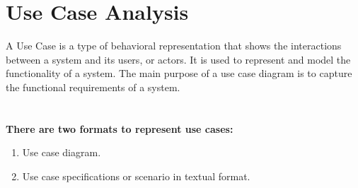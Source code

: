 \section{Use Case Analysis}
A Use Case is a type of behavioral representation that shows the interactions
between a system and its users, or actors. It is used to represent and model the
functionality of a system. The main purpose of a use case diagram is to capture
the functional requirements of a system. 
\\ \\ \\
\textbf{There are two formats to represent use cases:}
\begin{enumerate}
    \item Use case diagram.
    \item Use case specifications or scenario in textual format.
\end{enumerate}

\newpage

